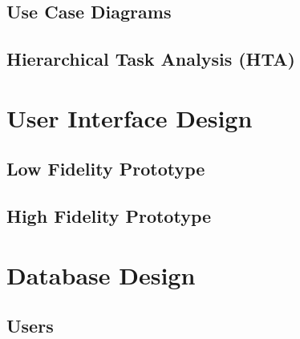 \subsection{Use Case Diagrams}
\label{sysdesign:usecase}

\subsection{Hierarchical Task Analysis (HTA)}
\label{sysdesign:hta}

\section{User Interface Design}
\label{design:uidesign}

\subsection{Low Fidelity Prototype}
\label{uidesign:low-fi}

\subsection{High Fidelity Prototype}
\label{uidesign:hi-fi}

\section{Database Design}
\label{design:database}

\subsection{Users}
\label{database:users}